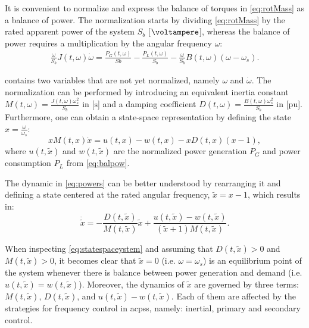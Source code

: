 \documentclass[utf8]{frontiersSCNS} %
\begin{document}
It is convenient to normalize and express the balance of torques in \cref{eq:rotMass} as a balance of power. The normalization starts by dividing \cref{eq:rotMass} by the rated apparent power of the system $S_b$ [$\si{\voltampere}$], whereas the balance of power requires a multiplication by the angular frequency $\omega$: 
\begin{align}\label{eq:balpow}
	\frac{\omega}{S_b} J(t,\omega) \dot{\omega} = \frac{P_G(t,\omega)}{Sb} - \frac{P_L(t,\omega)}{S_b} - \frac{\omega}{S_b} B(t,\omega) (\omega - \omega_s).
\end{align}

 contains two variables that are not yet normalized, namely  $\omega$ and $\dot{\omega}$. The normalization can be performed by introducing an equivalent inertia constant  $ M(t,\omega) = \frac{J(t,\omega) \omega_s^2}{S_b}$ in [$\si{\second}$] and a damping coefficient $ D(t,\omega) = \frac{B(t,\omega) \omega_s^2}{S_b}$ in [pu]. Furthermore, one can obtain a state-space representation by defining the state $ x = \frac{\omega}{\omega_s} $:
\begin{equation}\label{eq:powers}
	x M(t,x) \dot{x} = u(t,x) - w(t,x) - x D(t,x) (x - 1),
\end{equation}
where $u(t,\tilde{x})$ and $w(t,\tilde{x})$ are the normalized power generation $P_G$ and power consumption $P_L$ from \cref{eq:balpow}.

The dynamic in \cref{eq:powers} can be better understood by rearranging it and defining a state centered at the rated angular frequency, $ \widetilde{x}  = x - 1 $, which results in:
\begin{equation}\label{eq:statespaceystem}
    \dot{\widetilde{x}} = -\dfrac{D(t,\widetilde{x})}{M(t,\widetilde{x})} \widetilde{x} + \dfrac{u(t,\widetilde{x}) - w(t,\widetilde{x})}{(\widetilde{x}+1) M(t,\widetilde{x})}. 
\end{equation}


When inspecting \cref{eq:statespaceystem} and assuming that $ D(t,\widetilde{x}) > 0$ and $M(t,\widetilde{x}) > 0 $, it becomes clear that $ \widetilde{x} = 0 $  (i.e. $ \omega = \omega_s$) is an equilibrium point of the system whenever there is balance between power generation and demand (i.e. $u(t,\widetilde{x}) = w(t,\widetilde{x})$). Moreover, the dynamics of $ \widetilde{x} $ are governed by three terms: $ M(t,\widetilde{x})$, $D(t,\widetilde{x})$, and $ u(t,\widetilde{x}) - w(t,\widetilde{x}) $. Each of them are affected by the strategies for frequency control in \glspl{acps}, namely: inertial, primary and secondary control.
\end{document}
